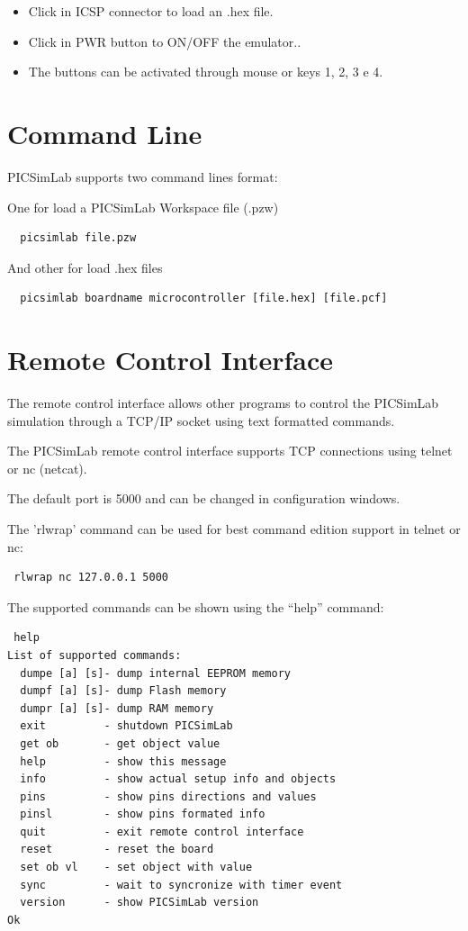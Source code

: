 \begin{itemize}
 \item Click in ICSP connector to load an .hex file.
 \item Click in PWR button to ON/OFF the emulator..
 \item The buttons can be activated through mouse or keys 1, 2, 3 e 4.
\end{itemize}


\section{Command Line}

PICSimLab supports two command lines format:

One for load a PICSimLab Workspace file (.pzw) 
\begin{verbatim}
  picsimlab file.pzw
\end{verbatim}

And other for load .hex files
\begin{verbatim}
  picsimlab boardname microcontroller [file.hex] [file.pcf]
\end{verbatim}


\section{Remote Control Interface}\hypertarget{def:rcontrol}{}

The remote control interface allows other programs to control the PICSimLab simulation
through a TCP/IP socket using text formatted commands. 

The PICSimLab remote control interface supports TCP connections using telnet or nc (netcat).

The default port is 5000 and can be changed in configuration windows. 

The 'rlwrap' command can be used for best command edition support in telnet or nc:
\begin{verbatim}
 rlwrap nc 127.0.0.1 5000
\end{verbatim}
  
The supported commands can be shown using the ``help'' command:  
\begin{verbatim}
 help
List of supported commands:
  dumpe [a] [s]- dump internal EEPROM memory
  dumpf [a] [s]- dump Flash memory
  dumpr [a] [s]- dump RAM memory
  exit         - shutdown PICSimLab
  get ob       - get object value
  help         - show this message
  info         - show actual setup info and objects
  pins         - show pins directions and values
  pinsl        - show pins formated info
  quit         - exit remote control interface
  reset        - reset the board
  set ob vl    - set object with value
  sync         - wait to syncronize with timer event
  version      - show PICSimLab version
Ok
\end{verbatim}
  

